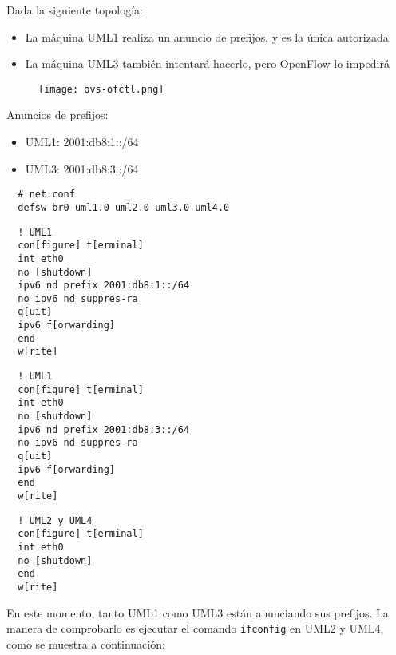 
Dada la siguiente topología:

\begin{itemize}
  \item La máquina UML1 realiza un anuncio de prefijos, y es la única
  autorizada
  \item La máquina UML3 también intentará hacerlo, pero OpenFlow lo impedirá
\end{itemize}

\begin{figure}[h]
  \texttt{[image: ovs-ofctl.png]}
  \centering
\end{figure}

Anuncios de prefijos:

\begin{itemize}
  \item UML1: 2001:db8:1::/64
  \item UML3: 2001:db8:3::/64
\end{itemize}

\begin{verbatim}
  # net.conf
  defsw br0 uml1.0 uml2.0 uml3.0 uml4.0
\end{verbatim}

\begin{verbatim}
  ! UML1
  con[figure] t[erminal]
  int eth0
  no [shutdown]
  ipv6 nd prefix 2001:db8:1::/64
  no ipv6 nd suppres-ra
  q[uit]
  ipv6 f[orwarding]
  end
  w[rite]
\end{verbatim}

\begin{verbatim}
  ! UML1
  con[figure] t[erminal]
  int eth0
  no [shutdown]
  ipv6 nd prefix 2001:db8:3::/64
  no ipv6 nd suppres-ra
  q[uit]
  ipv6 f[orwarding]
  end
  w[rite]
\end{verbatim}

\begin{verbatim}
  ! UML2 y UML4
  con[figure] t[erminal]
  int eth0
  no [shutdown]
  end
  w[rite]
\end{verbatim}

En este momento, tanto UML1 como UML3 están anunciando sus prefijos.
La manera de comprobarlo es ejecutar el comando \texttt{ifconfig}
en UML2 y UML4, como se muestra a continuación:

